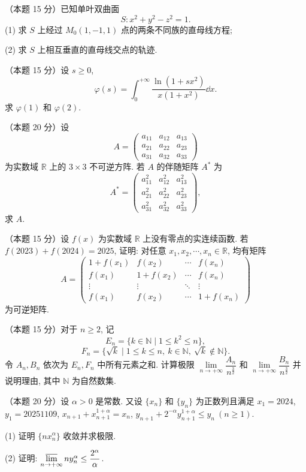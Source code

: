 
\begin{problems}

\item[一、]（本题 15 分）已知单叶双曲面
\[
  S: x^2+y^2-z^2=1. \tag{1}
\]
(1) 求 $S$ 上经过 $M_0(1,-1,1)$ 点的两条不同族的直母线方程;

(2) 求 $S$ 上相互垂直的直母线交点的轨迹.

\item[二、]（本题 15 分）设 $s\ge 0$,
\[
  \varphi(s)=\int_0^{+\infty}\frac{\ln(1+sx^2)}{x(1+x^2)}\dd x.
\]
求 $\varphi(1)$ 和 $\varphi(2)$.

\item[三、]（本题 20 分）设
\[
  A=\begin{pmatrix}
    a_{11} & a_{12} & a_{13}\\
    a_{21} & a_{22} & a_{23}\\
    a_{31} & a_{32} & a_{33}
  \end{pmatrix}
\]
为实数域 $\mathbb{R}$ 上的 $3\times 3$ 不可逆方阵. 若 $A$ 的伴随矩阵 $A^*$ 为
\[
  A^*=\begin{pmatrix}
    a_{11}^2 & a_{12}^2 & a_{13}^2\\
    a_{21}^2 & a_{22}^2 & a_{23}^2\\
    a_{31}^2 & a_{32}^2 & a_{33}^2
  \end{pmatrix},
\]
求 $A$.

\item[四、]（本题 15 分）设 $f(x)$ 为实数域 $\mathbb{R}$ 上没有零点的实连续函数. 若 $f(2023)+f(2024)=2025$, 证明: 对任意 $x_1,x_2,\cdots,x_n\in\mathbb{R}$, 均有矩阵
\[
  A=\begin{pmatrix}
    1+f(x_1) & f(x_2) & \cdots & f(x_n)\\
    f(x_1) & 1+f(x_2) & \cdots & f(x_n)\\
    \vdots & \vdots & \ddots & \vdots\\
    f(x_1) & f(x_2) & \cdots & 1+f(x_n)
  \end{pmatrix}
\]
为可逆矩阵.

\item[五、]（本题 15 分）对于 $n\ge 2$, 记
\[
  E_n=\{k\in\mathbb{N}\mid 1\le k^2\le n\},
\]
\[
  F_n=\{\sqrt{k}\mid 1\le k\le n,\ k\in\mathbb{N},\ \sqrt{k}\notin\mathbb{N}\}.
\]
令 $A_n,B_n$ 依次为 $E_n,F_n$ 中所有元素之和. 计算极限 $\lim\limits_{n\to+\infty}\dfrac{A_n}{n^{\frac{3}{2}}}$ 和 $\lim\limits_{n\to+\infty}\dfrac{B_n}{n^{\frac{3}{2}}}$ 并说明理由, 其中 $\mathbb{N}$ 为自然数集.

\item[六、]（本题 20 分）设 $\alpha>0$ 是常数. 又设 $\{x_n\}$ 和 $\{y_n\}$ 为正数列且满足 $x_1=2024$, $y_1=20251109$, $x_{n+1}+x_{n+1}^{1+\alpha}=x_n$, $y_{n+1}+2^{-\alpha}y_{n+1}^{1+\alpha}\le y_n\ (n\ge 1)$.

(1) 证明 $\{nx_n^{\alpha}\}$ 收敛并求极限.

(2) 证明: $\varlimsup\limits_{n\to+\infty}ny_n^{\alpha}\le\dfrac{2^{\alpha}}{\alpha}$.

\end{problems}
